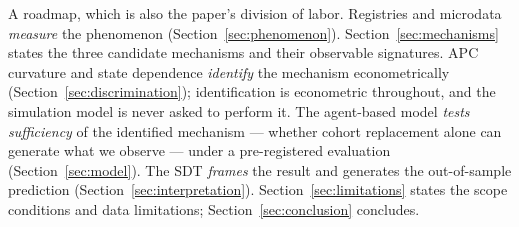A roadmap, which is also the paper's division of labor. Registries and microdata
\emph{measure} the phenomenon (Section~\ref{sec:phenomenon}).
Section~\ref{sec:mechanisms} states the three candidate mechanisms and their
observable signatures. APC curvature and state dependence \emph{identify} the
mechanism econometrically (Section~\ref{sec:discrimination}); identification is
econometric throughout, and the simulation model is never asked to perform it.
The agent-based model \emph{tests sufficiency} of the identified mechanism ---
whether cohort replacement alone can generate what we observe --- under a
pre-registered evaluation (Section~\ref{sec:model}). The SDT \emph{frames} the
result and generates the out-of-sample prediction
(Section~\ref{sec:interpretation}). Section~\ref{sec:limitations} states the
scope conditions and data limitations; Section~\ref{sec:conclusion} concludes.

